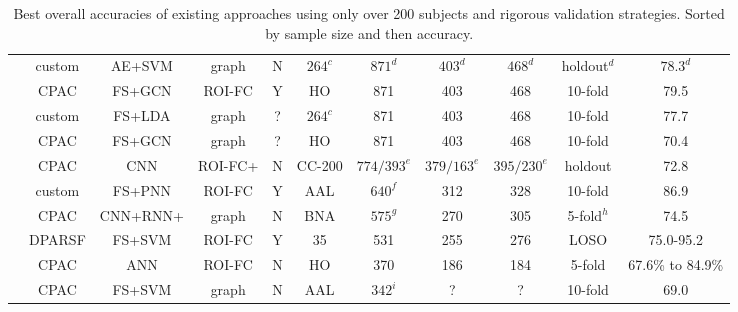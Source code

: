 \documentclass[10pt]{article}
\begin{document}
\begin{landscape}
\begin{table}
\begin{tabular}{lcccccccccc}
    \citeauthor{yinDiagnosisAutismSpectrum2021}                        &  custom  & AE+SVM &  graph   &   N    & \(264^c\)  & \(871^d\) & \(403^d\) & \(468^d\)  &  holdout\(^d\) & \(78.3^d\) \\
    \citeauthor{shaoClassificationASDBased2021}                        &   CPAC   & FS+GCN &  ROI-FC  &   Y    &     HO     &  871  &  403  &  468  &  10-fold   &       79.5       \\
    \citeauthor{mostafaDiagnosisAutismSpectrum2019}                    &  custom  & FS+LDA &  graph   &   ?    & \(264^c\)  &  871  &  403  &  468  &  10-fold   &       77.7       \\
    \citeauthor{parisotDiseasePredictionUsing2018}                     &   CPAC   & FS+GCN &  graph   &   ?    &     HO     &  871  &  403  &  468  &  10-fold   &       70.4       \\
    \citeauthor{khoslaEnsembleLearning3D2019}                          &   CPAC   &  CNN   &  ROI-FC+ &   N    &   CC-200  &\(774/393^e\)&\(379/163^e\)&\(395/230^e\)&holdout& 72.8 \\
    \citeauthor{iidakaRestingStateFunctional2015}                      &  custom  & FS+PNN &  ROI-FC  &   Y    &     AAL   &\(640^f\)& 312  &  328  &  10-fold   &       86.9       \\
    \citeauthor{byeonArtificialNeuralNetwork2020}                      &   CPAC  & CNN+RNN+ & graph   &   N    &     BNA    &\(575^g\)& 270 &  305  & 5-fold\(^h\)&       74.5      \\
    \citeauthor{wangFunctionalConnectivitybasedClassification2019}     &  DPARSF  & FS+SVM &  ROI-FC  &   Y    &     35     &  531  &  255  &  276  &   LOSO    &      75.0-95.2    \\
    \citeauthor{liMultisiteFMRIAnalysis2020}                           &   CPAC   &  ANN   &  ROI-FC  &   N    &     HO     &  370  &  186  &  184  &   5-fold   & 67.6\% to 84.9\% \\
    \citeauthor{kazeminejadTopologicalPropertiesRestingState2019}      &   CPAC   & FS+SVM &  graph   &   N    &     AAL   &\(342^i\)&  ?   &   ?   &  10-fold   &       69.0       \\
    \bottomrule
  \end{tabular} \label{tab:existing-attempts}
  \caption{
    Best overall accuracies of existing approaches using only over 200 subjects and rigorous validation strategies. Sorted by sample size and then accuracy.
}
\end{table}
\end{landscape}
\end{document}
